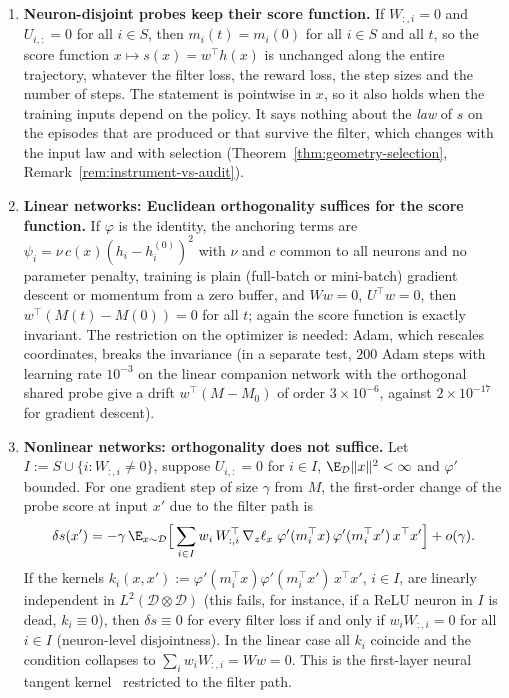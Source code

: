 \begin{theorem}\label{thm:geometry-training}
\leavevmode
\begin{enumerate}
  \item \textbf{Neuron-disjoint probes keep their score function.} If $W_{:,i} = 0$ and $U_{i,:} = 0$ for all $i \in S$, then $m_i(t) = m_i(0)$ for all $i \in S$ and all $t$, so the score function $x \mapsto s(x) = w^\top h(x)$ is unchanged along the entire trajectory, whatever the filter loss, the reward loss, the step sizes and the number of steps. The statement is pointwise in $x$, so it also holds when the training inputs depend on the policy. It says nothing about the \emph{law} of $s$ on the episodes that are produced or that survive the filter, which changes with the input law and with selection (Theorem~\ref{thm:geometry-selection}, Remark~\ref{rem:instrument-vs-audit}).
  \item \textbf{Linear networks: Euclidean orthogonality suffices for the score function.} If $\varphi$ is the identity, the anchoring terms are $\psi_i = \nu\, c(x)(h_i - h_i^{(0)})^2$ with $\nu$ and $c$ common to all neurons and no parameter penalty, training is plain (full-batch or mini-batch) gradient descent or momentum from a zero buffer, and $W w = 0$, $U^\top w = 0$, then $w^\top (M(t) - M(0)) = 0$ for all $t$; again the score function is exactly invariant. The restriction on the optimizer is needed: Adam, which rescales coordinates, breaks the invariance (in a separate test, $200$ Adam steps with learning rate $10^{-3}$ on the linear companion network with the orthogonal shared probe give a drift $w^\top(M - M_0)$ of order $3 \times 10^{-6}$, against $2 \times 10^{-17}$ for gradient descent).
  \item \textbf{Nonlinear networks: orthogonality does not suffice.} Let $I := S \cup \{i : W_{:,i} \neq 0\}$, suppose $U_{i,:} = 0$ for $i \in I$, $\E_{\mathcal{D}}\|x\|^2 < \infty$ and $\varphi'$ bounded. For one gradient step of size $\gamma$ from $M$, the first-order change of the probe score at input $x'$ due to the filter path is
  \begin{equation}\label{eq:ntk-drift}
    \delta s(x') = -\gamma\, \E_{x \sim \mathcal{D}}\Big[\sum_{i \in I} w_i\, W_{:,i}^\top\, \nabla_z \ell_x \; \varphi'(m_i^\top x)\, \varphi'(m_i^\top x')\, x^\top x'\Big] + o(\gamma).
  \end{equation}
  If the kernels $k_i(x, x') := \varphi'(m_i^\top x)\varphi'(m_i^\top x')\, x^\top x'$, $i \in I$, are linearly independent in $L^2(\mathcal{D} \otimes \mathcal{D})$ (this fails, for instance, if a ReLU neuron in $I$ is dead, $k_i \equiv 0$), then $\delta s \equiv 0$ for every filter loss if and only if $w_i W_{:,i} = 0$ for all $i \in I$ (neuron-level disjointness). In the linear case all $k_i$ coincide and the condition collapses to $\sum_i w_i W_{:,i} = W w = 0$. This is the first-layer neural tangent kernel~\cite{jacot2018} restricted to the filter path.

\end{enumerate}
\end{theorem}
